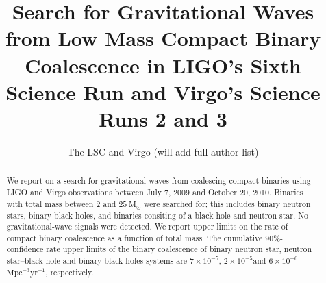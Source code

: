 \documentclass[prd,superscriptaddress,showpacs,amssymb,amsmath,amsfonts,aps,altaffilletter,nofootinbib,letterpaper,twocolumn]{revtex4}
\newcommand\fake[1]{\textcolor{red}{#1}}
\def\thercsid{\relax}
\renewcommand{\today}{\number\day\space\ifcase\month\or
  January\or February\or March\or April\or May\or June\or
  July\or August\or September\or October\or November\or December\fi
  \space\number\year}
\def\Msun{\ensuremath{\mathrm{M_{\odot}}}}
\def\BNSul{\ensuremath{7 \times 10^{-5}}}
\def\NSBHul{\ensuremath{2 \times 10^{-5}}}
\def\BBHul{\ensuremath{6 \times 10^{-6}}}
\begin{document}
\title{Search for Gravitational Waves from Low Mass Compact Binary Coalescence
in LIGO's Sixth Science Run and Virgo's Science Runs 2 and 3\\ }


\author{The LSC and Virgo (will add full author list)}
%
 \noaffiliation
%
%



\begin{abstract}

We report on a search for gravitational waves from coalescing compact
binaries using LIGO and Virgo observations between July 7, 2009 and
October 20, 2010.  Binaries with total mass between $2$ and $25~\Msun$
were searched for; this includes binary neutron stars, binary black
holes, and binaries consiting of a black hole and neutron star. No
gravitational-wave signals were detected. We report upper limits on the
rate of compact binary coalescence as a function of total mass. The
cumulative 90\%-confidence rate upper limits of the binary coalescence
of binary neutron star, neutron star--black hole and binary black holes
systems are \BNSul, \NSBHul and \BBHul $\mathrm{Mpc^{-3}yr^{-1}}$,
respectively.

\end{abstract}

\maketitle

\end{document}
